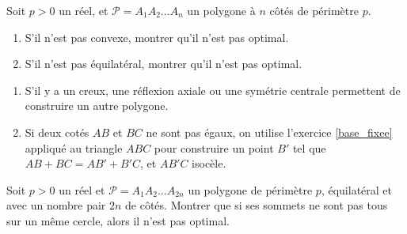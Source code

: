 \begin{exo}
Soit $p>0$ un réel, et $\mathcal P = A_1A_2...A_n$ un polygone à $n$ côtés de périmètre $p$. 
\begin{enumerate}
\item S'il n'est pas convexe, montrer qu'il n'est pas optimal.
\item S'il n'est pas équilatéral, montrer qu'il n'est pas optimal.
\end{enumerate}
\begin{sol}
\begin{enumerate}
\item S'il y a un creux, une réflexion axiale ou une symétrie centrale permettent de construire un autre polygone.
\item Si deux cotés $AB$ et $BC$ ne sont pas égaux, on utilise l'exercice \ref{base_fixee} appliqué au triangle $ABC$ pour construire un point $B'$ tel que $AB+BC = AB'+B'C$, et $AB'C$ isocèle.
\end{enumerate}
\end{sol}
\end{exo}



\begin{exo}
Soit $p>0$ un réel et $\mathcal P = A_1A_2...A_{2n}$ un polygone de périmètre $p$, équilatéral et avec un nombre pair $2n$ de côtés. Montrer que si ses sommets ne sont pas tous sur un même cercle, alors il n'est pas optimal.
\end{exo}









